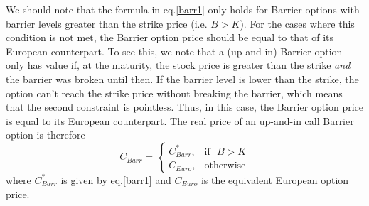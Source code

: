 We should note that the formula in eq.\eqref{barr1} only holds for Barrier options with barrier levels greater than the strike price (i.e. $B>K$).
For the cases where this condition is not met, the Barrier option price should be equal to that of its European counterpart. To see this, we note that a (up-and-in) Barrier option only has value if, at the maturity, the stock price is greater than the strike \emph{and} the barrier was broken until then. If the barrier level is lower than the strike, the option can't reach the strike price without breaking the barrier, which means that the second constraint is pointless. Thus, in this case, the Barrier option price is equal to its European counterpart.
The real price of an up-and-in call Barrier option is therefore
\begin{equation}\label{barr2}
C_{Barr}=\begin{cases} 
      C_{Barr}^*, & \mathrm{if}\ \ \ B>K\\
      C_{Euro}, & \mathrm{otherwise}
   \end{cases}
\end{equation}
\noindent where $C_{Barr}^*$ is given by eq.\eqref{barr1} and $C_{Euro}$ is the equivalent European option price.

\fi
